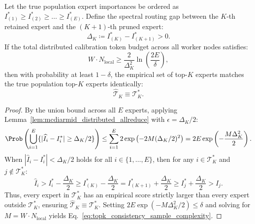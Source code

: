 \begin{corollary}
\label{cor:reap_topk_consistency}
Let the true population expert importances be ordered as $I_{(1)}^* \ge I_{(2)}^* \ge \dots \ge I_{(E)}^*$.
Define the spectral routing gap between the $K$-th retained expert and the $(K+1)$-th pruned expert:
\begin{equation}
\Delta_K \coloneqq I_{(K)}^* - I_{(K+1)}^* > 0.
\label{eq:spectral_routing_gap}
\end{equation}
If the total distributed calibration token budget across all worker nodes satisfies:
\begin{equation}
W \cdot N_{\text{local}} \ge \frac{2}{\Delta_K^2} \ln\left( \frac{2 E}{\delta} \right),
\label{eq:topk_consistency_sample_complexity}
\end{equation}
then with probability at least $1 - \delta$, the empirical set of top-$K$ experts matches the true population top-$K$ experts identically:
\begin{equation}
\widehat{\mathcal{T}}_K \equiv \mathcal{T}_K^*.
\label{eq:topk_exact_identification}
\end{equation}
\end{corollary}

\begin{proof}
By the union bound across all $E$ experts, applying Lemma~\ref{lem:mcdiarmid_distributed_allreduce} with $\epsilon = \Delta_K / 2$:
\begin{equation}
\Prob\left( \bigcup_{i=1}^E \{ |\widehat{I}_i - I_i^*| \ge \Delta_K / 2 \} \right) \le \sum_{i=1}^E 2 \exp\left( -2 M (\Delta_K/2)^2 \right) = 2 E \exp\left( -\frac{M \Delta_K^2}{2} \right).
\end{equation}
When $|\widehat{I}_i - I_i^*| < \Delta_K / 2$ holds for all $i \in \{1, \dots, E\}$, then for any $i \in \mathcal{T}_K^*$ and $j \notin \mathcal{T}_K^*$:
\begin{equation}
\widehat{I}_i > I_i^* - \frac{\Delta_K}{2} \ge I_{(K)}^* - \frac{\Delta_K}{2} = I_{(K+1)}^* + \frac{\Delta_K}{2} \ge I_j^* + \frac{\Delta_K}{2} > \widehat{I}_j.
\end{equation}
Thus, every expert in $\mathcal{T}_K^*$ has an empirical score strictly larger than every expert outside $\mathcal{T}_K^*$, ensuring $\widehat{\mathcal{T}}_K \equiv \mathcal{T}_K^*$.
Setting $2 E \exp(-M \Delta_K^2 / 2) \le \delta$ and solving for $M = W \cdot N_{\text{local}}$ yields Eq.~\eqref{eq:topk_consistency_sample_complexity}.
\end{proof}

